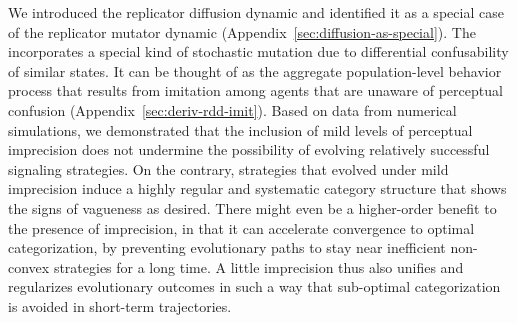 \documentclass[fleqn,reqno,10pt]{article}
\newcommand{\rdd}{\acro{rdd}} %
\begin{document}
We introduced the replicator diffusion dynamic and identified it as a special case of the
replicator mutator dynamic (Appendix~\ref{sec:diffusion-as-special}). The \rdd incorporates a
special kind of stochastic mutation due to differential confusability of similar states. It can
be thought of as the aggregate population-level behavior process that results from imitation
among agents that are unaware of perceptual confusion
(Appendix~\ref{sec:deriv-rdd-imit}). Based on data from numerical simulations, we demonstrated
that the inclusion of mild levels of perceptual imprecision does not undermine the possibility
of evolving relatively successful signaling strategies. On the contrary, strategies that
evolved under mild imprecision induce a highly regular and systematic category structure that
shows the signs of vagueness as desired. There might even be a higher-order benefit to the
presence of imprecision, in that it can accelerate convergence to optimal categorization, by
preventing evolutionary paths to stay near inefficient non-convex strategies for a long time. A
little imprecision thus also unifies and regularizes evolutionary outcomes in such a way that
sub-optimal categorization is avoided in short-term trajectories.



\printbibliography[heading=bibintoc]
\end{document}
